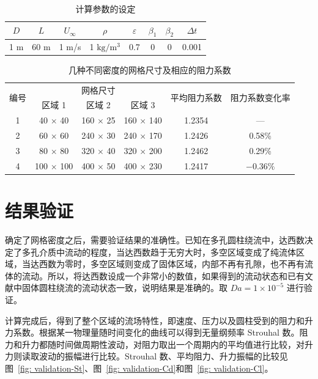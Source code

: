 \begin{table}[h]
	\caption{计算参数的设定}\label{tab: parameters}
	\vspace{.5em}\centering\wuhao
	\begin{tabular}{*{8}{c}}
		\toprule[1.5pt]
		$D$ & $L$ & $U_{\infty}$ & $\rho$ & $\varepsilon$ & $\beta_1$ & $\beta_2$ & $\Delta t$\\
		\midrule[1pt]
		1 m & 60 m & 1 m/s & 1 $\mathrm{kg}/\mathrm{m}^3$ & 0.7 & 0 & 0 & 0.001 \\
		\bottomrule[1.5pt]
	\end{tabular}
\end{table}

\begin{table}[h]
	\caption{几种不同密度的网格尺寸及相应的阻力系数}\label{tab: grid}
	\vspace{.5em}\centering\wuhao
	\begin{tabular}{cccccc}
		\toprule[1.5pt]
		\multirow{2}[3]{*}{编号} & \multicolumn{3}{c}{网格尺寸} & \multirow{2}[3]{*}{平均阻力系数} & \multirow{2}[3]{*}{阻力系数变化率} \\
		\cmidrule[.67pt](lr){2-4}
		& 区域 1 & 区域 2 & 区域 3 & & \\
		\midrule[1pt]
		1 & 40 $\times$ 40 & 160 $\times$ 25 & 160 $\times$ 140 & 1.2354 & — \\
		2 & 60 $\times$ 60 & 240 $\times$ 30 & 240 $\times$ 170 & 1.2426 & 0.58\% \\
		3 & 80 $\times$ 80 & 320 $\times$ 40 & 320 $\times$ 200 & 1.2462 & 0.29\% \\
		4 & 100 $\times$ 100 & 400 $\times$ 50 & 400 $\times$ 230 & 1.2417 & $-0.36\%$ \\
		\bottomrule[1.5pt]
	\end{tabular}
\end{table}

\section{结果验证}\label{sec: validation}

确定了网格密度之后，需要验证结果的准确性。已知在多孔圆柱绕流中，达西数决定了多孔介质中流动的程度，当达西数趋于无穷大时，多空区域变成了纯流体区域，当达西数为零时，多空区域则变成了固体区域，内部不再有孔隙，也不再有流体的流动。所以，将达西数设成一个非常小的数值，如果得到的流动状态和已有文献中固体圆柱绕流的流动状态一致，说明结果是准确的。取 $Da=1\times 10^{-5}$ 进行验证。

计算完成后，得到了整个区域的流场特性，即速度、压力以及圆柱受到的阻力和升力系数。根据某一物理量随时间变化的曲线可以得到无量纲频率 Strouhal 数。阻力和升力都随时间做周期性波动，对阻力取出一个周期内的平均值进行比较，对升力则读取波动的振幅进行比较。Strouhal 数、平均阻力、升力振幅的比较见图~\ref{fig: validation-St}、图~\ref{fig: validation-Cd}和图~\ref{fig: validation-Cl}。


